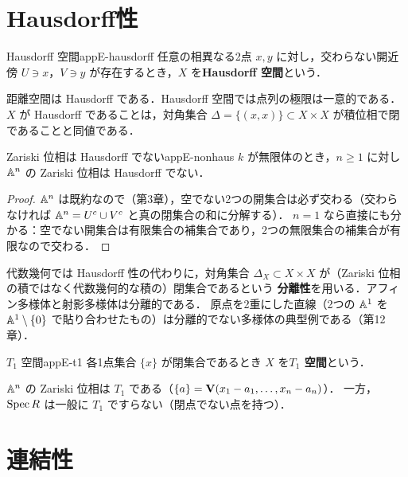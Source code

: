 \section{Hausdorff性}

\begin{mydef}{Hausdorff 空間}{appE-hausdorff}
任意の相異なる2点 $x,y$ に対し，交わらない開近傍 $U\ni x$，$V\ni y$ が存在するとき，$X$ を\textbf{Hausdorff 空間}という．
\end{mydef}

距離空間は Hausdorff である．Hausdorff 空間では点列の極限は一意的である．
$X$ が Hausdorff であることは，対角集合 $\Delta=\{(x,x)\}\subset X\times X$ が積位相で閉であることと同値である．

\begin{myprop}{Zariski 位相は Hausdorff でない}{appE-nonhaus}
$k$ が無限体のとき，$n\geq1$ に対し $\mathbb{A}^n$ の Zariski 位相は Hausdorff でない．
\end{myprop}
\begin{proof}
$\mathbb{A}^n$ は既約なので（第3章），空でない2つの開集合は必ず交わる（交わらなければ $\mathbb{A}^n=U^c\cup V^c$ と真の閉集合の和に分解する）．
$n=1$ なら直接にも分かる：空でない開集合は有限集合の補集合であり，2つの無限集合の補集合が有限なので交わる．
\end{proof}

\begin{note}
代数幾何では Hausdorff 性の代わりに，対角集合 $\Delta_X\subset X\times X$ が（Zariski 位相の積ではなく代数幾何的な積の）閉集合であるという
\textbf{分離性}を用いる．アフィン多様体と射影多様体は分離的である．
原点を2重にした直線（2つの $\mathbb{A}^1$ を $\mathbb{A}^1\setminus\{0\}$ で貼り合わせたもの）は分離的でない多様体の典型例である（第12章）．
\end{note}

\begin{mydef}{$T_1$ 空間}{appE-t1}
各1点集合 $\{x\}$ が閉集合であるとき $X$ を\textbf{$T_1$ 空間}という．
\end{mydef}

$\mathbb{A}^n$ の Zariski 位相は $T_1$ である（$\{a\}=\mathbf{V}(x_1-a_1,\dots,x_n-a_n)$）．
一方，$\operatorname{Spec} R$ は一般に $T_1$ ですらない（閉点でない点を持つ）．

\section{連結性}

